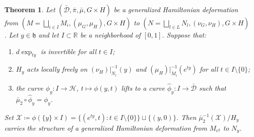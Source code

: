 \documentclass[reqno]{amsart}
\theoremstyle{plain}
\newtheorem{Thm}{Theorem}[section]
\theoremstyle{definition}
\begin{document}
\begin{Thm}\label{reduction}
Let $(\bar{\mathcal{D}}, \bar{\pi}, \bar{\mu}, G\times H)$ be a generalized Hamiltonian deformation from $(M = \bigsqcup_{i \in I} M_i, (\mu_G, \mu_H), G\times H)$ to $(N = \bigsqcup_{l \in L} N_l, (\nu_G, \nu_H), G\times H)$. Let $y \in \mathfrak{h}$ and let $I \subset \mathbb{R}$ be a neighborhood of $[0,1]$. Suppose that:
\begin{enumerate}[label={\textup{(\roman*)}}]
\item\label{jkmndrxc} $d\exp_{ty}$ is invertible for all $t \in I$;
\item\label{pnn277gb} $H_y$ acts locally freely on $(\nu_H)|_{N_l}^{-1}(y)$ and $(\mu_H)|_{M_i}^{-1}(e^{ty})$ for all $t \in I \setminus \{0\}$;
\item\label{i4svqrm1} the curve $\phi_y: I \to \mathcal{H}$, $t \mapsto \phi(y, t)$ lifts to a curve $\widehat{\phi}_y: I \to \bar{\mathcal{D}}$ such that $\bar{\mu}_2 \circ \widehat{\phi}_y = \phi_y$.
\end{enumerate}
Set $\mathcal{X} \coloneqq \phi(\{y\} \times I) = \{(e^{ty}, t) : t \in I \setminus \{0\}\} \sqcup \{(y, 0)\}$. Then $\bar{\mu}_2^{-1}(\mathcal{X})/H_y$ carries the structure of a generalized Hamiltonian deformation from $M_{e^y}$ to $N_y$.
\end{Thm}
\end{document}
